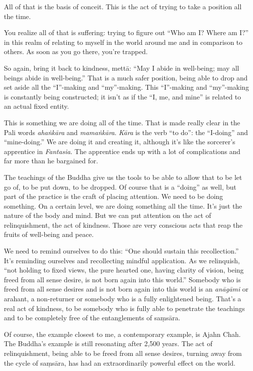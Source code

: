 All of that is the basis of conceit. This is the act of trying to take a
position all the time.

You realize all of that is suffering: trying to figure out “Who am I?
Where am I?” in this realm of relating to myself in the world around me
and in comparison to others. As soon as you go there, you’re trapped.

So again, bring it back to kindness, mettā: “May I abide in well-being;
may all beings abide in well-being.” That is a much safer position,
being able to drop and set aside all the “I”-making and “my”-making.
This “I”-making and “my”-making is constantly being constructed; it
isn’t as if the “I, me, and mine” is related to an actual fixed entity.

This is something we are doing all of the time. That is made really
clear in the Pali words \emph{ahaṅkāra} and \emph{mamaṅkāra}.
\emph{Kāra} is the verb “to do”: the “I-doing” and “mine-doing.” We are
doing it and creating it, although it’s like the sorcerer’s apprentice
in \emph{Fantasia}. The apprentice ends up with a lot of complications
and far more than he bargained for.

The teachings of the Buddha give us the tools to be able to allow that
to be let go of, to be put down, to be dropped. Of course that is a
“doing” as well, but part of the practice is the craft of placing
attention. We need to be doing something. On a certain level, we are
doing something all the time. It’s just the nature of the body and mind.
But we can put attention on the act of relinquishment, the act of
kindness. Those are very conscious acts that reap the fruits of
well-being and peace.

We need to remind ourselves to do this: “One should sustain this
recollection.” It’s reminding ourselves and recollecting mindful
application. As we relinquish, “not holding to fixed views, the pure
hearted one, having clarity of vision, being freed from all sense
desire, is not born again into this world.” Somebody who is freed from
all sense desires and is not born again into this world is an
\emph{anāgāmi} or arahant, a non-returner or somebody who is a fully
enlightened being. That’s a real act of kindness, to be somebody who is
fully able to penetrate the teachings and to be completely free of the
entanglements of saṃsāra.

Of course, the example closest to me, a contemporary example, is Ajahn
Chah. The Buddha’s example is still resonating after 2,500 years. The
act of relinquishment, being able to be freed from all sense desires,
turning away from the cycle of saṃsāra, has had an extraordinarily
powerful effect on the world.

